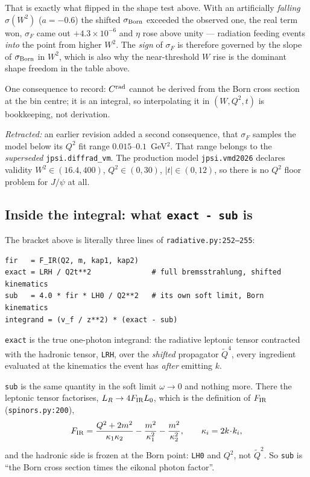 \documentclass[11pt]{article}
\newcommand{\crad}{C^{\rm rad}}
\begin{document}
That is exactly what flipped in the shape test above. With an artificially \emph{falling}
$\sigma(W^2)$ ($a=-0.6$) the shifted $\sigma_{\rm Born}$ exceeded the observed one, the real term won,
$\sigma_F$ came out $+4.3\times10^{-6}$ and $\eta$ rose above unity --- radiation feeding events
\emph{into} the point from higher $W^2$. The \emph{sign} of $\sigma_F$ is therefore governed by the
slope of $\sigma_{\rm Born}$ in $W^2$, which is also why the near-threshold $W$ rise is the dominant
shape freedom in the table above.

One consequence to record: $\crad$ cannot be derived from the Born cross section at the bin centre;
it is an integral, so interpolating it in $(W,Q^2,t)$ is bookkeeping, not derivation.

\emph{Retracted:} an earlier revision added a second consequence, that $\sigma_F$ samples the model
below its $Q^2$ fit range $0.015$--$0.1$~GeV$^2$. That range belongs to the \emph{superseded}
\texttt{jpsi.diffrad\_vm}. The production model \texttt{jpsi.vmd2026} declares validity
$W^2\in(16.4,400)$, $Q^2\in(0,30)$, $|t|\in(0,12)$, so there is no $Q^2$ floor problem for $J/\psi$
at all.

\subsection*{Inside the integral: what \texttt{exact - sub} is}

The bracket above is literally three lines of \texttt{radiative.py:252--255}:
\begin{verbatim}
fir   = F_IR(Q2, m, kap1, kap2)
exact = LRH / Q2t**2              # full bremsstrahlung, shifted kinematics
sub   = 4.0 * fir * LH0 / Q2**2   # its own soft limit, Born kinematics
integrand = (v_f / z**2) * (exact - sub)
\end{verbatim}

\texttt{exact} is the true one-photon integrand: the radiative leptonic tensor contracted with the
hadronic tensor, \texttt{LRH}, over the \emph{shifted} propagator $\tilde Q^4$, every ingredient
evaluated at the kinematics the event has \emph{after} emitting $k$.

\texttt{sub} is the same quantity in the soft limit $\omega\to0$ and nothing more. There the
leptonic tensor factorises, $L_R\to 4F_{\rm IR}L_0$, which is the definition of $F_{\rm IR}$
(\texttt{spinors.py:200}),
\begin{equation}
F_{\rm IR}=\frac{Q^2+2m^2}{\kappa_1\kappa_2}-\frac{m^2}{\kappa_1^2}-\frac{m^2}{\kappa_2^2},
\qquad \kappa_i=2k\!\cdot\!k_i ,
\end{equation}
and the hadronic side is frozen at the Born point: \texttt{LH0} and $Q^2$, not $\tilde Q^2$. So
\texttt{sub} is ``the Born cross section times the eikonal photon factor''.
\end{document}

